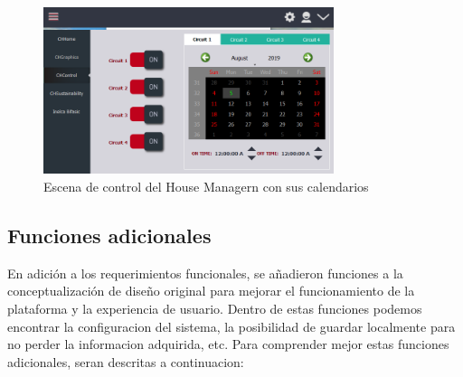 \begin{figure}[htbp]
	\centerline{\includegraphics[width=8.5cm]{figuras/housemanager_control.png}}
	\caption{Escena de control del House Managern con sus calendarios}
	\label{fig_8}
\end{figure}

\subsection{Funciones adicionales}

En adición a los requerimientos funcionales, se añadieron funciones a la conceptualización de diseño original para mejorar el funcionamiento de la plataforma y la experiencia de usuario. Dentro de estas funciones podemos encontrar la configuracion del sistema, la posibilidad de guardar localmente para no perder la informacion adquirida, etc. 
Para comprender mejor estas funciones adicionales, seran descritas a continuacion:


